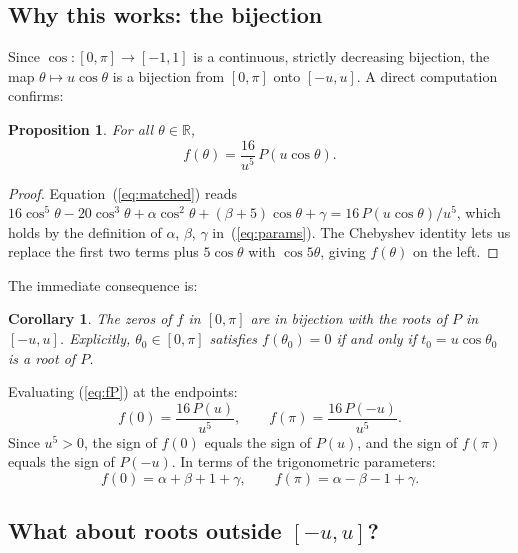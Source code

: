 \documentclass[12pt]{article}
\newtheorem{proposition}[theorem]{Proposition}
\newtheorem{corollary}[theorem]{Corollary}
\theoremstyle{definition}
\theoremstyle{remark}
\begin{document}
\subsection{Why this works: the bijection}

Since $\cos\colon [0,\pi] \to [-1,1]$ is a continuous, strictly decreasing bijection, the map $\theta \mapsto u\cos\theta$ is a bijection from $[0,\pi]$ onto $[-u, u]$. A direct computation confirms:

\begin{proposition}\label{prop:fP}
For all $\theta \in \mathbb{R}$,
\begin{equation}\label{eq:fP}
f(\theta) = \frac{16}{u^5}\,P(u\cos\theta).
\end{equation}
\end{proposition}

\begin{proof}
Equation~(\ref{eq:matched}) reads $16\cos^5\!\theta - 20\cos^3\!\theta + \alpha\cos^2\!\theta + (\beta+5)\cos\theta + \gamma = 16\,P(u\cos\theta)/u^5$, which holds by the definition of $\alpha$, $\beta$, $\gamma$ in~(\ref{eq:params}). The Chebyshev identity lets us replace the first two terms plus $5\cos\theta$ with $\cos 5\theta$, giving $f(\theta)$ on the left.
\end{proof}

The immediate consequence is:

\begin{corollary}\label{cor:bijection}
The zeros of $f$ in $[0,\pi]$ are in bijection with the roots of $P$ in $[-u,u]$. Explicitly, $\theta_0 \in [0,\pi]$ satisfies $f(\theta_0) = 0$ if and only if $t_0 = u\cos\theta_0$ is a root of $P$.
\end{corollary}

Evaluating (\ref{eq:fP}) at the endpoints:
\begin{equation}\label{eq:boundary}
f(0) = \frac{16\,P(u)}{u^5}, \qquad f(\pi) = \frac{16\,P(-u)}{u^5}.
\end{equation}
Since $u^5 > 0$, the sign of $f(0)$ equals the sign of $P(u)$, and the sign of $f(\pi)$ equals the sign of $P(-u)$. In terms of the trigonometric parameters:
\begin{equation}\label{eq:boundary_vals}
f(0) = \alpha + \beta + 1 + \gamma, \qquad f(\pi) = \alpha - \beta - 1 + \gamma.
\end{equation}

\subsection{What about roots outside $[-u,u]$?}
\end{document}
